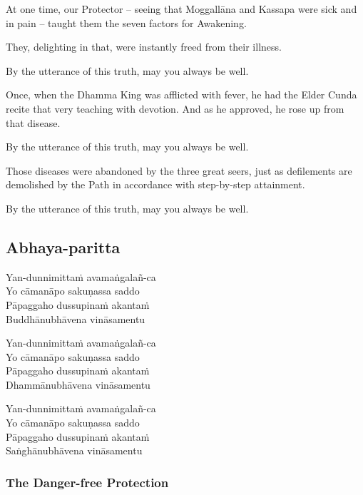 At one time, our Protector -- seeing that Moggallāna and Kassapa were sick and
in pain -- taught them the seven factors for Awakening.

They, delighting in that, were instantly freed from their illness.

By the utterance of this truth, may you always be well.

Once, when the Dhamma King was afflicted with fever, he had the Elder Cunda
recite that very teaching with devotion. And as he approved, he rose up from
that disease.

By the utterance of this truth, may you always be well.

Those diseases were abandoned by the three great seers, just as defilements are
demolished by the Path in accordance with step-by-step attainment.

By the utterance of this truth, may you always be well.

\subsection{Abhaya-paritta}
\label{yan-dunnimittam}


\begin{paritta}
Yan-dunnimittaṁ avamaṅgalañ-ca\\
Yo cāmanāpo sakuṇassa saddo\\
Pāpaggaho dussupinaṁ akantaṁ\\
Buddhānubhāvena vināsamentu

Yan-dunnimittaṁ avamaṅgalañ-ca\\
Yo cāmanāpo sakuṇassa saddo\\
Pāpaggaho dussupinaṁ akantaṁ\\
Dhammānubhāvena vināsamentu

Yan-dunnimittaṁ avamaṅgalañ-ca\\
Yo cāmanāpo sakuṇassa saddo\\
Pāpaggaho dussupinaṁ akantaṁ\\
Saṅghānubhāvena vināsamentu
\end{paritta}

\bigskip

{\centering
\par}

\subsubsection{The Danger-free Protection}

